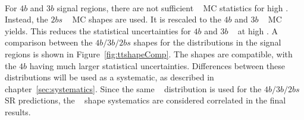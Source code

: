 \paragraph{}
For $4b$ and $3b$ signal regions, there are not sufficient \ttbar~ MC statistics for high \mtwoJ.
Instead, the $2bs$ \ttbar~ MC shapes are used.
It is rescaled to the $4b$ and $3b$ \ttbar~ MC yields.
This reduces the statistical uncertainties for $4b$ and $3b$ \ttbar~ at high \mtwoJ.
A comparison between the $4b/3b/2bs$ shapes for the \mtwoJ distributions in the signal regions is shown in Figure~\ref{fig:ttshapeComp}.
The shapes are compatible, with the $4b$ having much larger statistical uncertainties.  
Differences between these distributions will be used as a systematic, as described in chapter~\ref{sec:systematics}.
Since the same \ttbar~ distribution is used for the $4b/3b/2bs$ SR predictions, the \ttbar~ shape systematics are considered correlated in the final results. 



